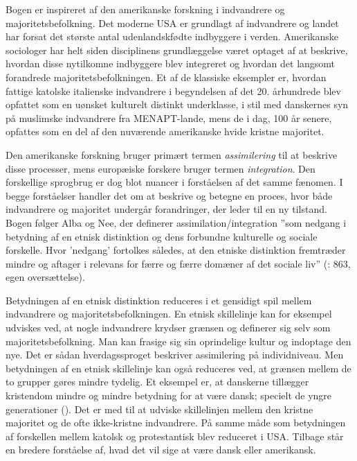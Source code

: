 \documentclass[
]{book}
\begin{document}
Bogen er inspireret af den amerikanske forskning i indvandrere og majoritetsbefolkning. Det moderne USA er grundlagt af indvandrere og landet har forsat det største antal udenlandskfødte indbyggere i verden. Amerikanske sociologer har helt siden disciplinens grundlæggelse været optaget af at beskrive, hvordan disse nytilkomne indbyggere blev integreret og hvordan det langsomt forandrede majoritetsbefolkningen. Et af de klassiske eksempler er, hvordan fattige katolske italienske indvandrere i begyndelsen af det 20. århundrede blev opfattet som en uønsket kulturelt distinkt underklasse, i stil med danskernes syn på muslimske indvandrere fra MENAPT-lande, mens de i dag, 100 år senere, opfattes som en del af den nuværende amerikanske hvide kristne majoritet.

Den amerikanske forskning bruger primært termen \emph{assimilering} til at beskrive disse processer, mens europæiske forskere bruger termen \emph{integration}. Den forskellige sprogbrug er dog blot nuancer i forståelsen af det samme fænomen. I begge forståelser handler det om at beskrive og betegne en proces, hvor både indvandrere og majoritet undergår forandringer, der leder til en ny tilstand. Bogen følger Alba og Nee, der definerer assimilation/integration ''som nedgang i betydning af en etnisk distinktion og dens forbundne kulturelle og sociale forskelle. Hvor 'nedgang' fortolkes således, at den etniske distinktion fremtræder mindre og aftager i relevans for færre og færre domæner af det sociale liv'' (: 863, egen oversættelse).

Betydningen af en etnisk distinktion reduceres i et gensidigt spil mellem indvandrere og majoritetsbefolkningen. En etnisk skillelinje kan for eksempel udviskes ved, at nogle indvandrere krydser grænsen og definerer sig selv som majoritetsbefolkning. Man kan frasige sig sin oprindelige kultur og indoptage den nye. Det er sådan hverdagssproget beskriver assimilering på individniveau. Men betydningen af en etnisk skillelinje kan også reduceres ved, at grænsen mellem de to grupper gøres mindre tydelig. Et eksempel er, at danskerne tillægger kristendom mindre og mindre betydning for at være dansk; specielt de yngre generationer (). Det er med til at udviske skillelinjen mellem den kristne majoritet og de ofte ikke-kristne indvandrere. På samme måde som betydningen af forskellen mellem katolsk og protestantisk blev reduceret i USA. Tilbage står en bredere forståelse af, hvad det vil sige at være dansk eller amerikansk.
\end{document}
